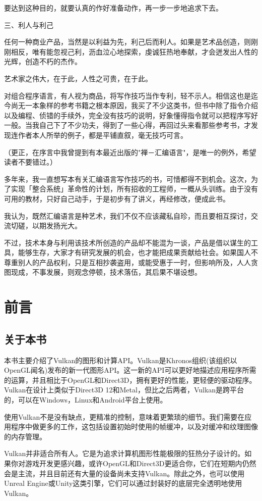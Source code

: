 \documentclass{ctexart}
\begin{document}
要达到这种目的，就要认真的作好准备动作，再一步一步地追求下去。

三、利人与利己

任何一种商业产品，当然是以利益为先，利己后而利人。如果是艺术品创造，则刚刚相反，唯有能忽视己利，沥血泣心地探索，虔诚狂热地奉献，才会迸发出人性的光辉，创造不朽的杰作。

艺术家之伟大，在于此，人性之可贵，在于此。

对组合程序语言，有人视为商品，将写作技巧当作专利，轻不示人。相信这也是迄今尚无一本象样的参考书籍之根本原因，我买了不少这类书，但书中除了指令介绍以及编程、侦错的手续外，完全没有技巧的说明，好象懂得指令就可以把程序写好一般。当我自己下了不少功夫，得到了一些心得，再回过头来看那些参考书，才发现连作者本人所举的例子，都是平铺直叙，毫无技巧可言。

（更正，在序言中我曾提到有本最近出版的"禅－汇编语言"，是唯一的例外，希望读者不要错过。）

多年来，我一直想写本有关汇编语言写作技巧的书，可惜都得不到机会。这次，为了实现「整合系统」革命性的计划，所有招收的工程师，一概从头训练。由于没有可用的教材，只好自己动手，于是初步有了讲义，再经修改，便成此书。

我认为，既然汇编语言是种艺术，我们不仅不应该藏私自珍，而且要相互探讨，交流切磋，以期发扬光大。

不过，技术本身与利用该技术所创造的产品却不能混为一谈，产品是借以谋生的工具，能够生存，大家才有研究发展的机会，也才能把成果贡献给社会。如果国人不尊重别人的产品权利，只是互相抄袭盗用，或能受惠于一时，但影响所及，人人贪图现成，不事发展，则观念停顿，技术落伍，其后果不堪设想。

\newpage
\section{前言}
\subsection{关于本书}
本书主要介绍了Vulkan的图形和计算API。Vulkan是Khronos组织(该组织以OpenGL闻名)发布的新一代图形API。这一新的API可以更好地描述应用程序所需的运算，并且相比于OpenGL和Direct3D，拥有更好的性能，更轻便的驱动程序。Vulkan在设计上类似于Direct3D 12和Metal，但比之后两者，Vulkan是跨平台的，可以在Windows，Linux和Android平台上使用。

使用Vulkan不是没有缺点，更精准的控制，意味着更繁琐的细节。我们需要在应用程序中做更多的工作，这包括设置初始时使用的帧缓冲，以及对缓冲和纹理图像的内存管理。

Vulkan并非适合所有人。它是为追求计算机图形性能极限的狂热分子设计的。如果你对游戏开发更感兴趣，或许OpenGL和Direct3D更适合你，它们在短期内仍然会是主流，并且目前还有大量的设备尚未支持Vulkan。除此之外，也可以使用Unreal Engine或Unity这类引擎，它们可以通过封装好的底层完全透明地使用Vulkan。
\end{document}
